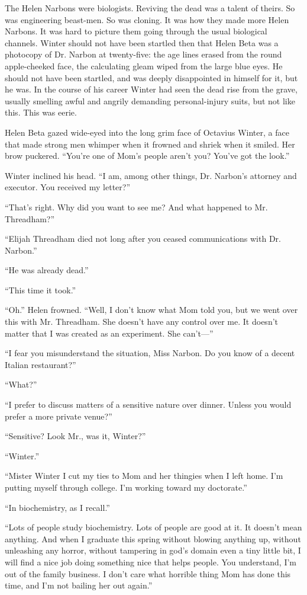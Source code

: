 \documentclass[ebook,10pt]{memoir}
\begin{document}
The Helen Narbons were biologists. Reviving the dead was a talent of
theirs. So was engineering beast-men. So was cloning. It was how they
made more Helen Narbons. It was hard to picture them going through the
usual biological channels. Winter should not have been startled then
that Helen Beta was a photocopy of Dr. Narbon at twenty-five: the age
lines erased from the round apple-cheeked face, the calculating gleam
wiped from the large blue eyes. He should not have been startled, and
was deeply disappointed in himself for it, but he was. In the course
of his career Winter had seen the dead rise from the grave, usually
smelling awful and angrily demanding personal-injury suits, but not
like this. This was eerie.

Helen Beta gazed wide-eyed into the long grim face of Octavius Winter,
a face that made strong men whimper when it frowned and shriek when it
smiled. Her brow puckered. ``You're one of Mom's people aren't you?
You've got the look.''

Winter inclined his head. ``I am, among other things, Dr. Narbon's
attorney and executor. You received my letter?''

``That's right. Why did you want to see me? And what happened to
Mr. Threadham?''

``Elijah Threadham died not long after you ceased communications with
Dr. Narbon.''

``He was already dead.''

``This time it took.''

``Oh.'' Helen frowned. ``Well, I don't know what Mom told you, but we
went over this with Mr. Threadham. She doesn't have any control over
me. It doesn't matter that I was created as an experiment. She
can't---''

``I fear you misunderstand the situation, Miss Narbon. Do you know of
a decent Italian restaurant?''

``What?''

``I prefer to discuss matters of a sensitive nature over
dinner. Unless you would prefer a more private venue?''

``Sensitive? Look Mr., was it, Winter?''

``Winter.''

``Mister Winter I cut my ties to Mom and her thingies when I left
home. I'm putting myself through college. I'm working toward my
doctorate.''

``In biochemistry, as I recall.''

``Lots of people study biochemistry. Lots of people are good at it. It
doesn't mean anything. And when I graduate this spring without blowing
anything up, without unleashing any horror, without tampering in god's
domain even a tiny little bit, I will find a nice job doing something
nice that helps people. You understand, I'm out of the family
business. I don't care what horrible thing Mom has done this time, and
I'm not bailing her out again.''
\end{document}

